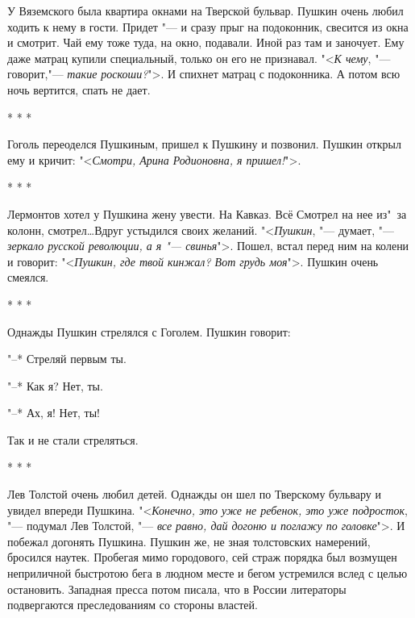 У Вяземского была квартира окнами на Тверской бульвар. Пушкин
очень любил ходить к нему в гости. Придет "--- и сразу прыг на
подоконник, свесится из окна и смотрит. Чай ему тоже  туда,  на
окно, подавали. Иной раз там и заночует. Ему даже матрац купили
специальный,  только  он  его не признавал. "<\textit{К чему}, "--- говорит,"---
\textit{такие роскоши?}">. И спихнет матрац с подоконника.  А  потом  всю
ночь вертится, спать не дает.

\begin{center}
    * * *
\end{center}

    Гоголь  переоделся  Пушкиным,  пришел к Пушкину и позвонил.
Пушкин открыл ему и кричит: "<\textit{Смотри, Арина Родионовна,  я  пришел!}">.

\begin{center}
    * * *
\end{center}
    Лермонтов хотел у Пушкина жену увести. На Кавказ. Всё Смотрел на
нее из"~за колонн, смотрел\dots Вдруг устыдился своих желаний.
"<\textit{Пушкин},  "---  думает,  "---  \textit{зеркало русской революции, а я "---
свинья}">. Пошел, встал перед ним на колени и  говорит:  "<\textit{Пушкин,
где твой кинжал? Вот грудь моя}">. Пушкин очень смеялся.

\begin{center}
    * * *
\end{center}

    Однажды Пушкин стрелялся с Гоголем. Пушкин говорит:

    "--* Стреляй первым ты.

    "--* Как я? Нет, ты.

    "--* Ах, я! Нет, ты!

    Так и не стали стреляться.

\begin{center}
    * * *
\end{center}

    Лев Толстой очень любил детей. Однажды он шел по  Тверскому
бульвару  и  увидел впереди Пушкина. "<\textit{Конечно, это уже не ребенок,
это уже подросток}, "--- подумал Лев Толстой, "--- \textit{все равно, дай
догоню и поглажу по головке}">. И побежал догонять Пушкина.  Пушкин
же, не зная толстовских намерений, бросился наутек. Пробегая
мимо городового, сей страж порядка был возмущен неприличной
быстротою бега в людном месте и бегом устремился вслед с  целью
остановить.  Западная пресса потом писала, что в России литераторы
подвергаются преследованиям со стороны властей.

